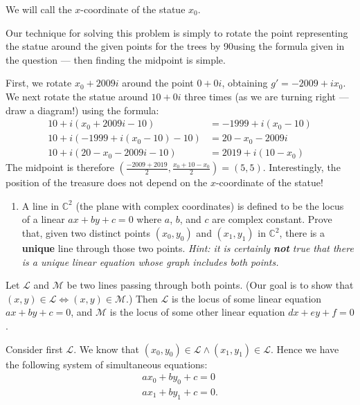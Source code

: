 \documentclass[a4paper,10pt]{article}
\newcommand{\answer}{\bfseries\color{Emerald}\refstepcounter{enumi}\item[\theenumi.]}
\begin{document}
We will call the $ x$-coordinate of the statue $ x_0 $.

Our technique for solving this problem is simply to rotate the point representing
the statue around the given points for the trees by 90\degree using the formula given
in the question --- then finding the midpoint is simple.

First, we rotate $ x_0 + 2009i $ around the point $ 0 + 0i $, obtaining $ g' = -2009 + ix_0 $.
We next rotate the statue around $ 10 + 0i $ three times (as we are turning
right --- draw a diagram!) using the formula:
\begin{align*}
  10 + i(x_0 + 2009i - 10)         &= -1999 + i(x_0 - 10)\\
  10 + i(-1999 + i(x_0 - 10) - 10) &= 20 - x_0 - 2009i\\
  10 + i(20 - x_0 - 2009i - 10)    &= 2019 + i(10 - x_0)
\end{align*}
The midpoint is therefore $ \left( \frac{-2009 + 2019}{2}, \frac{x_0 + 10 - x_0}{2} \right) = (5,5)$. Interestingly,
the position of the treasure does not depend on the $ x$-coordinate of the statue!

\filbreak\begin{enumerate}[resume]
  \answer A line in $ \mathbb{C}^2 $ (the plane with complex coordinates) is defined to be the locus of a linear
        $ ax + by + c = 0 $ where $ a $, $ b $, and $ c $ are complex constant. Prove that, given two distinct points $ (x_0, y_0) $
        and $ (x_1, y_1) $ in $ \mathbb{C}^2 $, there is a \textbf{unique} line through those two points. \textit{Hint: it is certainly \textbf{not} true
        that there is a unique linear equation whose graph includes both points.}
\end{enumerate}

Let $ \mathcal{L} $ and $ \mathcal{M} $ be two lines passing through both points. (Our goal is to show
that $ (x,y) \in \mathcal{L} \iff (x,y) \in \mathcal{M} $.) Then $ \mathcal{L} $ is the locus of some
linear equation $ ax + by + c = 0 $, and $ \mathcal{M} $ is the locus of some other linear
equation $ dx + ey + f = 0 $.

Consider first $ \mathcal{L} $. We know that $ (x_0, y_0) \in \mathcal{L} \wedge (x_1, y_1) \in \mathcal{L} $. Hence we
have the following system of simultaneous equations:
\begin{align*}
  ax_0 + by_0 + c = 0\\
  ax_1 + by_1 + c = 0.
\end{align*}
\end{document}
